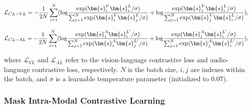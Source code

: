 \begin{equation}
\mathcal{L}_{CL-VL} = -\frac{1}{2N}\sum_{i=1}^{N}({\rm log}\frac{{\rm exp}(\bm{s}_i^{V}\bm{s}_i^{L}/\sigma)}{\sum_{j=1}^{N}{\rm exp}(\bm{s}_i^V\bm{s}_j^L/\sigma)} + {\rm log}\frac{{\rm exp}(\bm{s}_i^{V}\bm{s}_i^{L}/\sigma)}{\sum_{j=1}^{N}{\rm exp}(\bm{s}_j^V\bm{s}_i^L/\sigma)}),
\end{equation}

\begin{equation}
\mathcal{L}_{CL-AL} = -\frac{1}{2N}\sum_{i=1}^{N}({\rm log}\frac{{\rm exp}(\bm{s}_i^A\bm{s}_i^{L'}/\sigma)}{\sum_{j=1}^{N}{\rm exp}(\bm{s}_i^A\bm{s}_j^{L'}/\sigma)} + {\rm log}\frac{{\rm exp}(\bm{s}_i^A\bm{s}_i^{L'}/\sigma)}{\sum_{j=1}^{N}{\rm exp}(\bm{s}_j^A\bm{s}_i^{L'}/\sigma)}),
\end{equation}

where $\mathcal{L}_{VL}$ and $\mathcal{L}_{AL}$ refer to the vision-language contrastive loss and audio-language contrastive loss, respectively. $N$ is the batch size, $i,j$ are indexes within the batch, and $\sigma$ is a learnable temperature parameter (initialized to $0.07$).


\subsubsection{Mask Intra-Modal Contrastive Learning}


